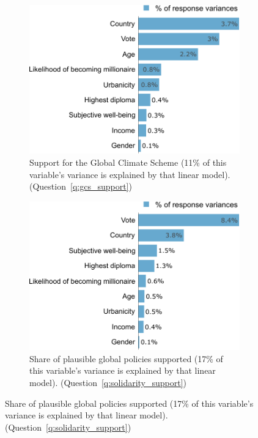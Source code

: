 \begin{figure}[h!]
\caption[Variance decomposition]{Variance decomposition: share of the variance explained by each covariate.}\label{fig:lmg}
\begin{subfigure}{.49\textwidth}
  \caption[]{Support for the Global Climate Scheme (11\% of this variable's variance is explained by that linear model). (Question~\ref{q:gcs_support})\label{fig:lmg_gcs}}
  \includegraphics[width=\textwidth]{../figures/all/lmg_gcs_support_few.pdf}
\end{subfigure} \quad
\begin{subfigure}{.49\textwidth}
  \caption[]{Share of plausible global policies supported (17\% of this variable's variance is explained by that linear model). (Question~\ref{q:solidarity_support})\label{fig:lmg_solidarity}}
  \includegraphics[width=\textwidth]{../figures/all/lmg_share_solidarity_supported_few.pdf}
\end{subfigure}
\end{figure}

